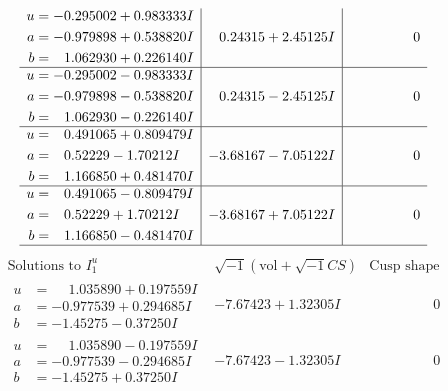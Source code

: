 \documentclass[1p]{elsarticle_modified}
\theoremstyle{definition}
\newcommand{\I}{\sqrt{-1}}
\begin{document}
$$\begin{array}{c|c|c}
\begin{aligned}
u &= -0.295002 + 0.983333 I \\
a &= -0.979898 + 0.538820 I \\
b &= \phantom{-}1.062930 + 0.226140 I\end{aligned}
 & \phantom{-}0.24315 + 2.45125 I & \phantom{-0.000000 } 0 \\ \hline\begin{aligned}
u &= -0.295002 - 0.983333 I \\
a &= -0.979898 - 0.538820 I \\
b &= \phantom{-}1.062930 - 0.226140 I\end{aligned}
 & \phantom{-}0.24315 - 2.45125 I & \phantom{-0.000000 } 0 \\ \hline\begin{aligned}
u &= \phantom{-}0.491065 + 0.809479 I \\
a &= \phantom{-}0.52229 - 1.70212 I \\
b &= \phantom{-}1.166850 + 0.481470 I\end{aligned}
 & -3.68167 - 7.05122 I & \phantom{-0.000000 } 0 \\ \hline\begin{aligned}
u &= \phantom{-}0.491065 - 0.809479 I \\
a &= \phantom{-}0.52229 + 1.70212 I \\
b &= \phantom{-}1.166850 - 0.481470 I\end{aligned}
 & -3.68167 + 7.05122 I & \phantom{-0.000000 } 0\\
 \hline 
 \end{array}$$\newpage$$\begin{array}{c|c|c}  
\text{Solutions to }I^u_{1}& \I (\text{vol} + \sqrt{-1}CS) & \text{Cusp shape}\\
 \hline 
\begin{aligned}
u &= \phantom{-}1.035890 + 0.197559 I \\
a &= -0.977539 + 0.294685 I \\
b &= -1.45275 - 0.37250 I\end{aligned}
 & -7.67423 + 1.32305 I & \phantom{-0.000000 } 0 \\ \hline\begin{aligned}
u &= \phantom{-}1.035890 - 0.197559 I \\
a &= -0.977539 - 0.294685 I \\
b &= -1.45275 + 0.37250 I\end{aligned}
 & -7.67423 - 1.32305 I & \phantom{-0.000000 } 0 \\ \hline\begin{aligned}

\end{aligned}
\end{array}$$
\end{document}
